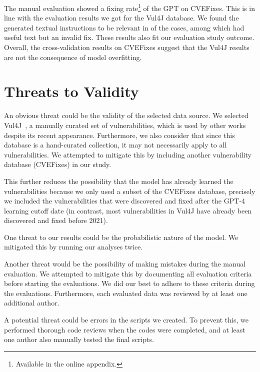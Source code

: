 The manual evaluation showed a \cvefixesrate{} fixing rate\footnote{Available in the online appendix.} of the GPT on CVEFixes.
This is in line with the evaluation results we got for the Vul4J database.
We found the generated textual instructions to be relevant in \cvefixesusefultextrate{} of the cases, among which \cvefixesonlytextrate{} had useful text but an invalid fix.
These results also fit our evaluation study outcome.
Overall, the cross-validation results on CVEFixes suggest that the Vul4J results are not the consequence of model overfitting.

\section{Threats to Validity}
\label{sec:threats}


An obvious threat could be the validity of the selected data source.
We selected Vul4J~\cite{vul4j}, a manually curated set of vulnerabilities, which is used by other works~\cite{pinconschi2022maestro, papotti2022acceptance, dietrich2023security, garg2023guiding} despite its recent appearance.
Furthermore, we also consider that since this database is a hand-curated collection, it may not necessarily apply to all vulnerabilities.
We attempted to mitigate this by including another vulnerability database (CVEFixes) in our study.

This further reduces the possibility that the model has already learned the vulnerabilities because we only used a subset of the CVEFixes database, precisely we included the vulnerabilities that were discovered and fixed after the GPT-4 learning cutoff date (in contrast, most vulnerabilities in Vul4J have already been discovered and fixed before 2021).

One threat to our results could be the probabilistic nature of the model.
We mitigated this by running our analyses twice.

Another threat would be the possibility of making mistakes during the manual evaluation.
We attempted to mitigate this by documenting all evaluation criteria before starting the evaluations.
We did our best to adhere to these criteria during the evaluations.
Furthermore, each evaluated data was reviewed by at least one additional author.

A potential threat could be errors in the scripts we created.
To prevent this, we performed thorough code reviews when the codes were completed, and at least one author also manually tested the final scripts.


